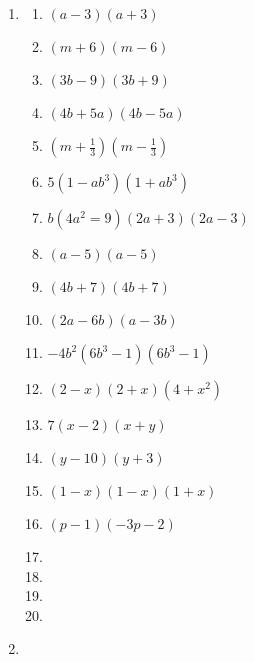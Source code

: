 \begin{enumerate}[itemsep=5pt, label=\textbf{\arabic*}. ]
\item %
\begin{multicols}{2}
\begin{enumerate}[itemsep=5pt, label=\textbf{(\alph*)} ] 
\item $(a - 3)(a + 3)$%
\item $(m + 6)(m - 6)$%
\item $(3b - 9)(3b + 9)$%
\item $(4b + 5a)(4b - 5a)$%
\item $(m +\frac{1}{3})(m -\frac{1}{3})$%
\item $5(1 - ab^3)(1 + ab^3)$%
\item $b(4a^2 = 9)(2a + 3)(2a - 3)$%
\item $(a - 5)(a - 5)$%
\item $(4b + 7)(4b + 7)$%
\item $(2a - 6b)(a - 3b)$%
\item $-4b^2(6b^3 - 1)(6b^3 - 1)$%
\item $(2 - x)(2 + x)(4 + x^2)$%
\item $7(x - 2)(x + y)$%
\item $(y - 10)(y + 3)$%
\item $(1 - x)(1 - x)(1 +x)$%
\item $(p - 1)(-3p-2)$%
\item %
\item %
\item %
\item %
\end{enumerate}
\end{multicols}


\item %
\begin{multicols}{2}
\begin{enumerate}[itemsep=5pt, label=\textbf{(\alph*)} ] 


\end{enumerate}
\end{multicols}
\end{enumerate}
